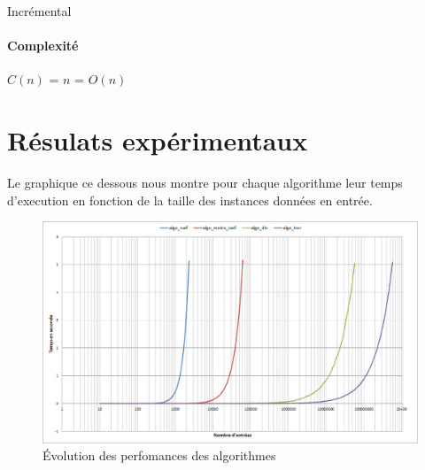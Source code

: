 \documentclass[11pt, a4paper]{article}
\begin{document}
\begin{algorithm}[H]
  \caption{Incrémental}
\end{algorithm}
\paragraph{Complexité}
$C(n)$ = $n$ = $O(n)$


\newpage
\section{Résulats expérimentaux}

Le graphique ce dessous nous montre pour chaque algorithme leur temps
d'execution en fonction de la taille des instances données en entrée.

\begin{figure}[h]
\includegraphics [scale=0.5]{courbe.png}
\caption{Évolution des perfomances des algorithmes}
\label{courbe}
\end{figure}
\end{document}
